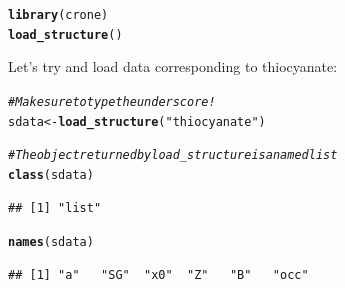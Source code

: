 \documentclass[12pt,a4paper]{article}\usepackage[]{graphicx}\usepackage[]{color}
\makeatletter
\newcommand{\hlstr}[1]{\textcolor[rgb]{0.192,0.494,0.8}{#1}}%
\newcommand{\hlcom}[1]{\textcolor[rgb]{0.678,0.584,0.686}{\textit{#1}}}%
\newcommand{\hlstd}[1]{\textcolor[rgb]{0.345,0.345,0.345}{#1}}%
\newcommand{\hlkwb}[1]{\textcolor[rgb]{0.69,0.353,0.396}{#1}}%
\newcommand{\hlkwd}[1]{\textcolor[rgb]{0.737,0.353,0.396}{\textbf{#1}}}%
\newenvironment{kframe}{%
 \def\at@end@of@kframe{}%
 \ifinner\ifhmode%
  \def\at@end@of@kframe{\end{minipage}}%
  \begin{minipage}{\columnwidth}%
 \fi\fi%
 \def\FrameCommand##1{\hskip\@totalleftmargin \hskip-\fboxsep
 \colorbox{shadecolor}{##1}\hskip-\fboxsep
     \hskip-\linewidth \hskip-\@totalleftmargin \hskip\columnwidth}%
 \MakeFramed {\advance\hsize-\width
   \@totalleftmargin\z@ \linewidth\hsize
   \@setminipage}}%
 {\par\unskip\endMakeFramed%
 \at@end@of@kframe}
\newenvironment{knitrout}{}{} %
\makeatother
\begin{document}
\begin{small}
\begin{knitrout}
\color{fgcolor}\begin{kframe}
\begin{alltt}
\hlkwd{library}\hlstd{(crone)}
\hlkwd{load_structure}\hlstd{()}
\end{alltt}


{\ttfamily\noindent\itshape\color{messagecolor}{\#\# \\\#\# 1D structures available for loading:}}

{\ttfamily\noindent\itshape\color{messagecolor}{\#\#\ \ \ \ beryllium\_fluoride}}

{\ttfamily\noindent\itshape\color{messagecolor}{\#\#\ \ \ \ carbon\_dioxide}}

{\ttfamily\noindent\itshape\color{messagecolor}{\#\#\ \ \ \ cyanate}}

{\ttfamily\noindent\itshape\color{messagecolor}{\#\#\ \ \ \ nitronium}}

{\ttfamily\noindent\itshape\color{messagecolor}{\#\#\ \ \ \ thiocyanate}}

{\ttfamily\noindent\itshape\color{messagecolor}{\#\#\ \ \ \ xenon\_difluoride}}

{\ttfamily\noindent\itshape\color{messagecolor}{\#\#\ \ \ \ pinkerton2015}}

{\ttfamily\noindent\itshape{}}\end{kframe}
\end{knitrout}
\end{small}

\noindent Let's try and load data corresponding to thiocyanate:

\begin{knitrout}
\color{fgcolor}\begin{kframe}
\begin{alltt}
\hlcom{# Make sure to type the underscore!}
\hlstd{sdata} \hlkwb{<-} \hlkwd{load_structure}\hlstd{(}\hlstr{"thiocyanate"}\hlstd{)}

\hlcom{# The object returned by load_structure is a named list}
\hlkwd{class}\hlstd{(sdata)}
\end{alltt}
\begin{verbatim}
## [1] "list"
\end{verbatim}
\begin{alltt}
\hlkwd{names}\hlstd{(sdata)}
\end{alltt}
\begin{verbatim}
## [1] "a"   "SG"  "x0"  "Z"   "B"   "occ"
\end{verbatim}
\end{kframe}
\end{knitrout}
\end{document}
